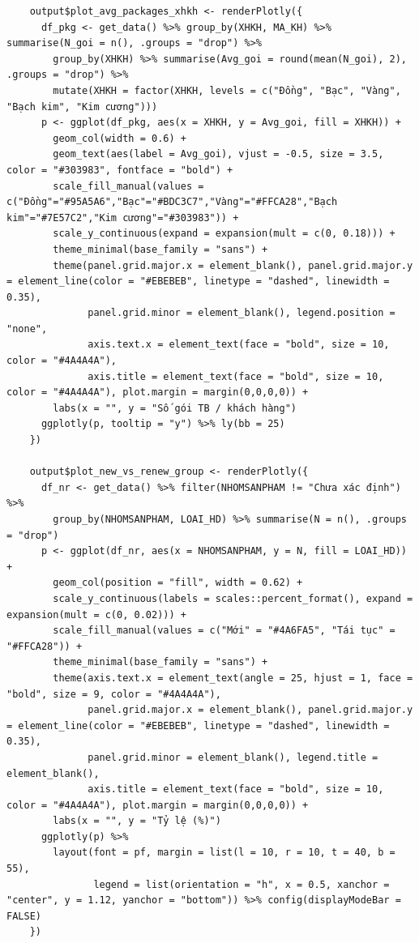 \documentclass[12pt, a4paper]{article}
\begin{document}
\begin{lstlisting}
    output$plot_avg_packages_xhkh <- renderPlotly({
      df_pkg <- get_data() %>% group_by(XHKH, MA_KH) %>% summarise(N_goi = n(), .groups = "drop") %>%
        group_by(XHKH) %>% summarise(Avg_goi = round(mean(N_goi), 2), .groups = "drop") %>%
        mutate(XHKH = factor(XHKH, levels = c("Đồng", "Bạc", "Vàng", "Bạch kim", "Kim cương")))
      p <- ggplot(df_pkg, aes(x = XHKH, y = Avg_goi, fill = XHKH)) +
        geom_col(width = 0.6) +
        geom_text(aes(label = Avg_goi), vjust = -0.5, size = 3.5, color = "#303983", fontface = "bold") +
        scale_fill_manual(values = c("Đồng"="#95A5A6","Bạc"="#BDC3C7","Vàng"="#FFCA28","Bạch kim"="#7E57C2","Kim cương"="#303983")) +
        scale_y_continuous(expand = expansion(mult = c(0, 0.18))) +
        theme_minimal(base_family = "sans") +
        theme(panel.grid.major.x = element_blank(), panel.grid.major.y = element_line(color = "#EBEBEB", linetype = "dashed", linewidth = 0.35),
              panel.grid.minor = element_blank(), legend.position = "none",
              axis.text.x = element_text(face = "bold", size = 10, color = "#4A4A4A"),
              axis.title = element_text(face = "bold", size = 10, color = "#4A4A4A"), plot.margin = margin(0,0,0,0)) +
        labs(x = "", y = "Số gói TB / khách hàng")
      ggplotly(p, tooltip = "y") %>% ly(bb = 25)
    })

    output$plot_new_vs_renew_group <- renderPlotly({
      df_nr <- get_data() %>% filter(NHOMSANPHAM != "Chưa xác định") %>%
        group_by(NHOMSANPHAM, LOAI_HD) %>% summarise(N = n(), .groups = "drop")
      p <- ggplot(df_nr, aes(x = NHOMSANPHAM, y = N, fill = LOAI_HD)) +
        geom_col(position = "fill", width = 0.62) +
        scale_y_continuous(labels = scales::percent_format(), expand = expansion(mult = c(0, 0.02))) +
        scale_fill_manual(values = c("Mới" = "#4A6FA5", "Tái tục" = "#FFCA28")) +
        theme_minimal(base_family = "sans") +
        theme(axis.text.x = element_text(angle = 25, hjust = 1, face = "bold", size = 9, color = "#4A4A4A"),
              panel.grid.major.x = element_blank(), panel.grid.major.y = element_line(color = "#EBEBEB", linetype = "dashed", linewidth = 0.35),
              panel.grid.minor = element_blank(), legend.title = element_blank(),
              axis.title = element_text(face = "bold", size = 10, color = "#4A4A4A"), plot.margin = margin(0,0,0,0)) +
        labs(x = "", y = "Tỷ lệ (%)")
      ggplotly(p) %>%
        layout(font = pf, margin = list(l = 10, r = 10, t = 40, b = 55),
               legend = list(orientation = "h", x = 0.5, xanchor = "center", y = 1.12, yanchor = "bottom")) %>% config(displayModeBar = FALSE)
    })


\end{lstlisting}
\end{document}
